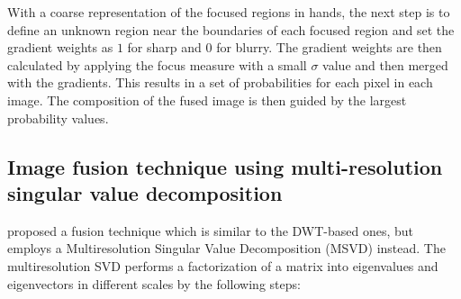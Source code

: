 With a coarse representation of the focused regions in hands, the next step is to define an unknown region near the boundaries of each focused region and set the gradient weights as $1$ for sharp and $0$ for blurry. The gradient weights are then calculated by applying the focus measure with a small $\sigma$ value and then merged with the gradients. This results in a set of probabilities for each pixel in each image. The composition of the fused image is then guided by the largest probability values.

\subsection{Image fusion technique using multi-resolution singular value decomposition}

 proposed a fusion technique which is similar to the DWT-based ones, but employs a Multiresolution Singular Value Decomposition (MSVD) instead. The multiresolution SVD performs a factorization of a matrix into eigenvalues and eigenvectors in different scales by the following steps:

